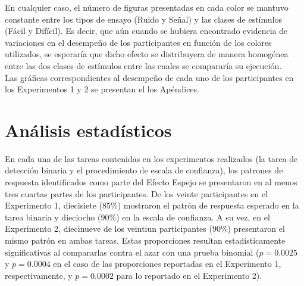 En cualquier caso, el número de figuras presentadas en cada color se mantuvo constante entre los tipos de ensayo (Ruido y Señal) y las clases de estímulos (Fácil y Difícil). Es decir, que aún cuando se hubiera encontrado evidencia de variaciones en el desempeño de los participantes en función de los colores utilizados, se esperaría que dicho efecto se distribuyera de manera homogénea entre las dos clases de estímulos entre las cuales se compararía su ejecución.\\

Las gráficas correspondientes al desempeño de cada uno de los participantes en los Experimentos 1 y 2 se presentan el los Apéndices.\\




































\section{Análisis estadísticos}

En cada una de las tareas contenidas en los experimentos realizados (la tarea de detección binaria y el procedimiento de escala de confianza), los patrones de respuesta identificados como parte del Efecto Espejo se presentaron en al menos tres cuartas partes de los participantes. De los veinte participantes en el Experimento 1, diecisiete ($85\%$) mostraron el patrón de respuesta esperado en la tarea binaria y dieciocho ($90\%$) en la escala de confianza. A su vez, en el Experimento 2, diecinueve de los veintiun participantes ($90\%$) presentaron el mismo patrón en ambas tareas. Estas proporciones resultan estadísticamente significativas al compararlas contra el azar con una prueba binomial ($p=0.0025$ y $p=0.0004$ en el caso de las proporciones reportadas en el Experimento 1, respectivamente, y $p=0.0002$ para lo reportado en el Experimento 2).\\

